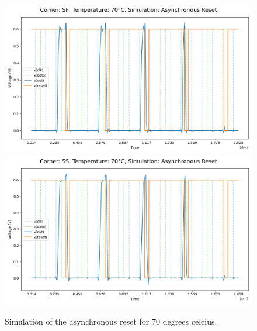 \begin{figure}[H]
    \vspace{5pt}
    \includegraphics[height= 0.21\textheight]{figures/aimspice/SF/70/W2.csv.png}
    \vspace{5pt}
    \includegraphics[height= 0.21\textheight]{figures/aimspice/SS/70/W2.csv.png}
    \caption{Simulation of the asynchronous reset for 70 degrees celcius.}
    \label{fig:aimspice_W2_70}
\end{figure}

\pagebreak

